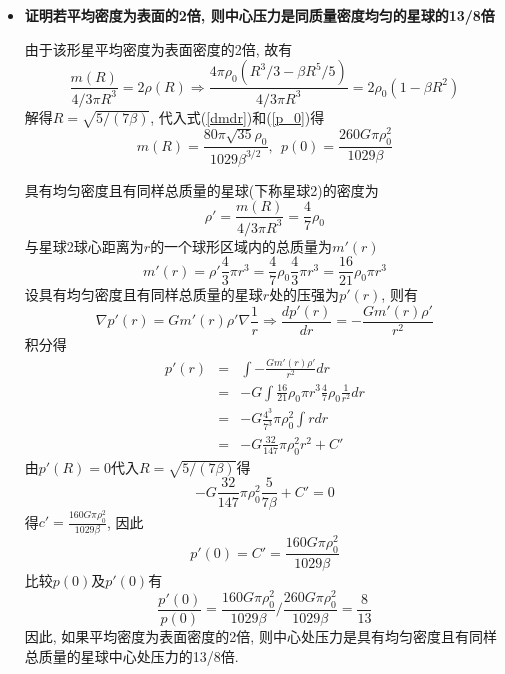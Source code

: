 \begin{solution}
\begin{itemize}
\item \textbf{证明若平均密度为表面的2倍, 则中心压力是同质量密度均匀的星球的13/8倍}

由于该形星平均密度为表面密度的2倍, 故有
\[
\frac{m(R)}{4/3\pi R^3} = 2 \rho(R) \Longrightarrow
\frac{4\pi\rho_0(R^3/3-\beta R^5/5)}{4/3\pi R^3} = 2 \rho_0(1-\beta R^2)
\]
解得$R=\sqrt{5/(7\beta)}$, 代入式(\ref{dmdr})和(\ref{p_0})得
\[
m(R) = \frac{80\pi\sqrt{35}\rho_0}{1029\beta^{3/2}}, {~~}
p(0) = \frac{260G\pi\rho_0^2}{1029\beta}
\]

具有均匀密度且有同样总质量的星球(下称星球2)的密度为
\[
\rho' = \frac{m(R)}{4/3\pi R^3} = \frac{4}{7}\rho_0
\]
与星球2球心距离为$r$的一个球形区域内的总质量为$m'(r)$
\[
m'(r) = \rho'\frac{4}{3}\pi r^3 = \frac{4}{7}\rho_0\frac{4}{3}\pi r^3 = \frac{16}{21}\rho_0\pi r^3
\]
设具有均匀密度且有同样总质量的星球$r$处的压强为$p'(r)$, 则有
\[
\nabla p'(r) = Gm'(r)\rho'\nabla \frac{1}{r} \Longrightarrow \frac{dp'(r)}{dr}= -\frac{Gm'(r)\rho'}{r^2}
\]
积分得
\begin{eqnarray}
p'(r) & = & \int -\frac{Gm'(r)\rho'}{r^2}dr\nonumber\\
      & = & -G\int \frac{16}{21}\rho_0\pi r^3 \frac{4}{7}\rho_0\frac{1}{r^2} dr\nonumber\\
      & = & -G\frac{4^3}{7^3}\pi\rho_0^2\int r dr\nonumber\\
      & = & -G\frac{32}{147}\pi\rho_0^2r^2 + C'\nonumber
\end{eqnarray}
由$p'(R)=0$代入$R=\sqrt{5/(7\beta)}$得
\[
-G\frac{32}{147}\pi\rho_0^2\frac{5}{7\beta} + C' = 0
\]
得$c'=\frac{160G\pi\rho_0^2}{1029\beta}$, 因此
\[
p'(0) = C' = \frac{160G\pi\rho_0^2}{1029\beta}
\]
比较$p(0)$及$p'(0)$有
\[
\frac{p'(0)}{p(0)} = \frac{160G\pi\rho_0^2}{1029\beta}\Big/\frac{260G\pi\rho_0^2}{1029\beta} = \frac{8}{13}
\]
因此, 如果平均密度为表面密度的2倍, 则中心处压力是具有均匀密度且有同样总质量的星球中心处压力的13/8倍.
\end{itemize}
\end{solution} 
